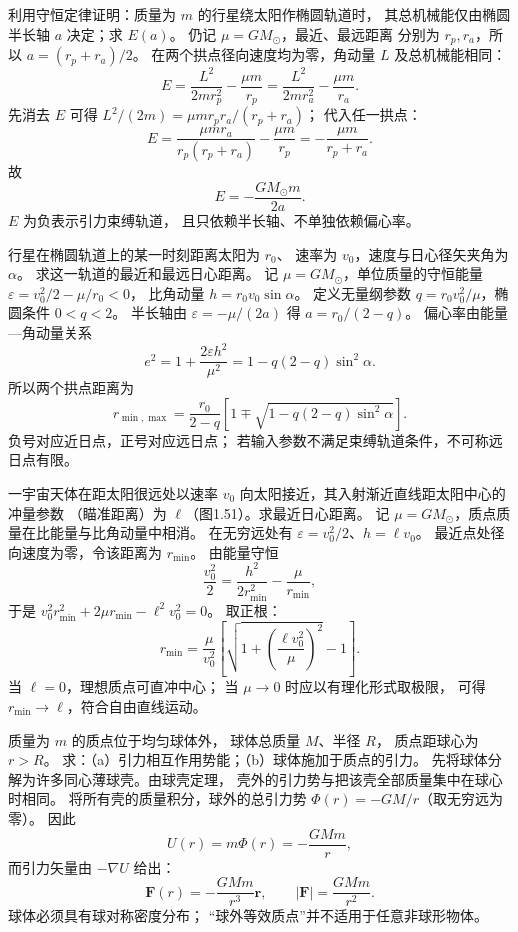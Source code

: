 利用守恒定律证明：质量为 $m$ 的行星绕太阳作椭圆轨道时，
其总机械能仅由椭圆半长轴 $a$ 决定；求 $E(a)$。
\exsolution
仍记 $\mu=GM_\odot$，最近、最远距离
分别为 $r_p,r_a$，所以 $a=(r_p+r_a)/2$。
在两个拱点径向速度均为零，角动量 $L$
及总机械能相同：
\[
E=\frac{L^2}{2mr_p^2}-\frac{\mu m}{r_p}
=\frac{L^2}{2mr_a^2}-\frac{\mu m}{r_a}.
\]
先消去 $E$ 可得
$L^2/(2m)=\mu m r_pr_a/(r_p+r_a)$；
代入任一拱点：
\[
E=\frac{\mu m r_a}{r_p(r_p+r_a)}
-\frac{\mu m}{r_p}
=-\frac{\mu m}{r_p+r_a}.
\]
故
\[
\boxed{E=-\frac{GM_\odot m}{2a}}.
\]
\excheck $E$ 为负表示引力束缚轨道，
且只依赖半长轴、不单独依赖偏心率。

行星在椭圆轨道上的某一时刻距离太阳为 $r_0$、
速率为 $v_0$，速度与日心径矢夹角为 $\alpha$。
求这一轨道的最近和最远日心距离。
\exsolution
记 $\mu=GM_\odot$，单位质量的守恒能量
$\varepsilon=v_0^2/2-\mu/r_0<0$，
比角动量 $h=r_0v_0\sin\alpha$。
定义无量纲参数
$q=r_0v_0^2/\mu$，椭圆条件 $0<q<2$。
半长轴由 $\varepsilon=-\mu/(2a)$ 得
$a=r_0/(2-q)$。
偏心率由能量—角动量关系
\[
e^2=1+\frac{2\varepsilon h^2}{\mu^2}
=1-q(2-q)\sin^2\alpha.
\]
所以两个拱点距离为
\[
\boxed{r_{\min,\max}=
\frac{r_0}{2-q}
\left[1\mp\sqrt{1-q(2-q)\sin^2\alpha}\right]}.
\]
\excheck 负号对应近日点，正号对应远日点；
若输入参数不满足束缚轨道条件，不可称远日点有限。

一宇宙天体在距太阳很远处以速率 $v_0$
向太阳接近，其入射渐近直线距太阳中心的冲量参数
（瞄准距离）为 $\ell$（图1.51）。求最近日心距离。
\exsolution
记 $\mu=GM_\odot$，质点质量在比能量与比角动量中相消。
在无穷远处有
$\varepsilon=v_0^2/2$、$h=\ell v_0$。
最近点处径向速度为零，令该距离为 $r_{\min}$。
由能量守恒
\[
\frac{v_0^2}{2}
=\frac{h^2}{2r_{\min}^2}-\frac{\mu}{r_{\min}},
\]
于是
$v_0^2r_{\min}^2+2\mu r_{\min}-\ell^2v_0^2=0$。
取正根：
\[
\boxed{r_{\min}=\frac{\mu}{v_0^2}
\left[\sqrt{1+\left(\frac{\ell v_0^2}{\mu}\right)^2}-1\right]}.
\]
\excheck 当 $\ell=0$，理想质点可直冲中心；
当 $\mu\to0$ 时应以有理化形式取极限，
可得 $r_{\min}\to\ell$，符合自由直线运动。

质量为 $m$ 的质点位于均匀球体外，
球体总质量 $M$、半径 $R$，
质点距球心为 $r>R$。
求：（a）引力相互作用势能；（b）球体施加于质点的引力。
\exsolution
先将球体分解为许多同心薄球壳。由球壳定理，
壳外的引力势与把该壳全部质量集中在球心时相同。
将所有壳的质量积分，球外的总引力势
$\Phi(r)=-GM/r$（取无穷远为零）。
因此
\[
\boxed{U(r)=m\Phi(r)=-\frac{GMm}{r}},
\]
而引力矢量由 $-\nabla U$ 给出：
\[
\boxed{\bm F(r)=-\frac{GMm}{r^3}\bm r},
\qquad |\bm F|=\frac{GMm}{r^2}.
\]
\excheck 球体必须具有球对称密度分布；
“球外等效质点”并不适用于任意非球形物体。

